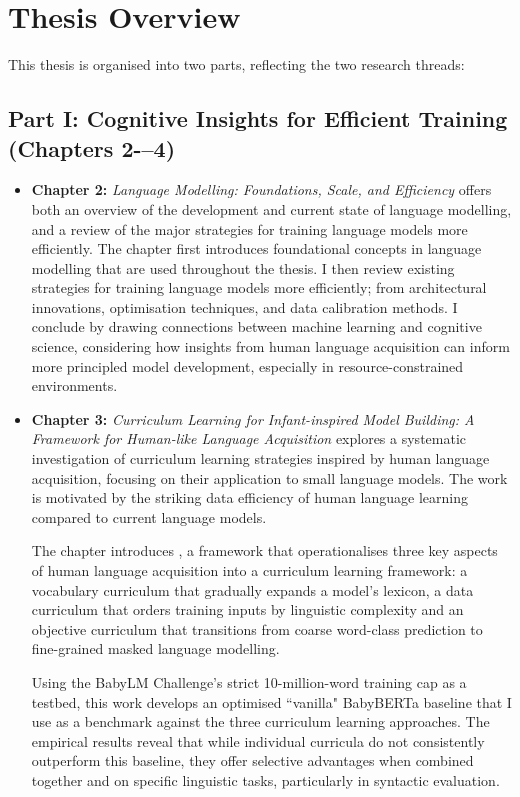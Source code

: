 \section*{Thesis Overview}

This thesis is organised into two parts, reflecting the two research threads:

\subsection*{Part I: Cognitive Insights for Efficient Training (Chapters 2-–4)}

\begin{itemize}

    \item \textbf{Chapter 2:} \emph{Language Modelling: Foundations, Scale, and Efficiency} offers both an overview of the development and current state of language modelling, and a review of the major strategies for training language models more efficiently. The chapter first introduces foundational concepts in language modelling that are used throughout the thesis. I then review existing strategies for training language models more efficiently; from architectural innovations, optimisation techniques, and data calibration methods. I conclude by drawing connections between machine learning and cognitive science, considering how insights from human language acquisition can inform more principled model development, especially in resource-constrained environments.

    \item \textbf{Chapter 3:} \emph{Curriculum Learning for Infant-inspired Model Building: A Framework for Human-like Language Acquisition}  
    explores a systematic investigation of curriculum learning strategies inspired by human language acquisition, focusing on their application to small language models. The work is motivated by the striking data efficiency of human language learning compared to current language models.

    The chapter introduces \climb, a framework that operationalises three key aspects of human language acquisition into a curriculum learning framework: a vocabulary curriculum that gradually expands a model's lexicon, a data curriculum that orders training inputs by linguistic complexity and an objective curriculum that transitions from coarse word-class prediction to fine-grained masked language modelling.

    Using the BabyLM Challenge's strict 10-million-word training cap as a testbed, this work develops an optimised ``vanilla" BabyBERTa baseline that I use as a benchmark against the three curriculum learning approaches. The empirical results reveal that while individual curricula do not consistently outperform this baseline, they offer selective advantages when combined together and on specific linguistic tasks, particularly in syntactic evaluation.


\end{itemize}
